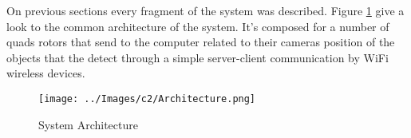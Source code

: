 On previous sections every fragment of the system was described. Figure \ref{fig:System_Architecture} give a look to the common architecture of the system. It's composed for a number of quads rotors that send to the computer related to their cameras position of the objects that the detect through a simple server-client communication by WiFi wireless devices.

\begin{figure}[hb]
	\centering
	\texttt{[image: ../Images/c2/Architecture.png]}
	\caption{System Architecture}
	\label{fig:System_Architecture}
\end{figure}
